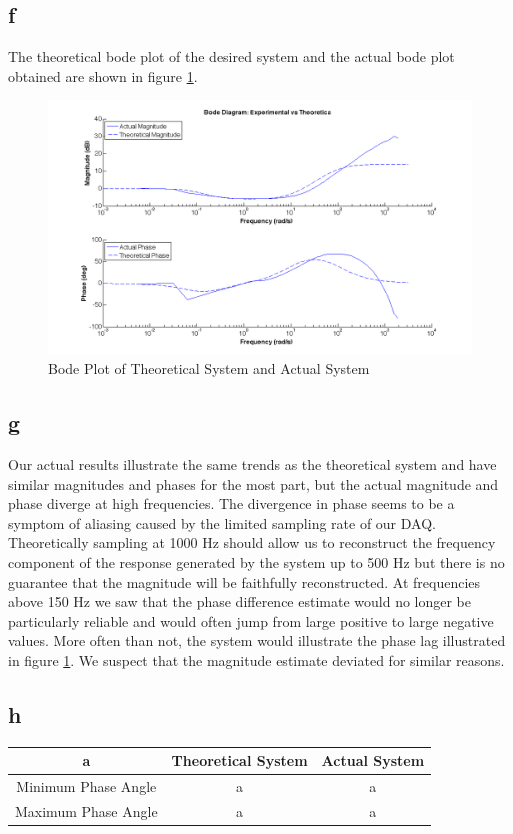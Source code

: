 \documentclass{article}
\theoremstyle{plain}
\theoremstyle{definition}
\theoremstyle{remark}
\begin{document}
\subsection*{f}
The theoretical bode plot of the desired system and the actual bode plot obtained are shown in figure \ref{q1_ff}.
\begin{figure}[hbt]
\begin{center}
\includegraphics[width = 17cm]{bodeplot.png}
\caption{Bode Plot of Theoretical System and Actual System}
\label{q1_ff}
\end{center}
\end{figure}

\subsection*{g}
Our actual results illustrate the same trends as the theoretical system and have similar magnitudes and phases for the most part, but the actual magnitude and phase diverge at high frequencies.  The divergence in phase seems to be a symptom of aliasing caused by the limited sampling rate of our DAQ.  Theoretically sampling at 1000 Hz should allow us to reconstruct the frequency component of the response generated by the system up to 500 Hz but there is no guarantee that the magnitude will be faithfully reconstructed.  At frequencies above 150 Hz we saw that the phase difference estimate would no longer be particularly reliable and would often jump from large positive to large negative values.  More often than not, the system would illustrate the phase lag illustrated in figure \ref{q1_ff}.  We suspect that the magnitude estimate deviated for similar reasons.

\subsection*{h}
\begin{table}[hbt]
\begin{center}
	\begin{tabular}{|c|c|c|}
		\hline
		a & \textbf{Theoretical System} & \textbf{Actual System}  \\ \hline
		Minimum Phase Angle & a & a \\
		Maximum Phase Angle & a & a \\
	\end{tabular}
\end{center}
\end{table}
\end{document}

